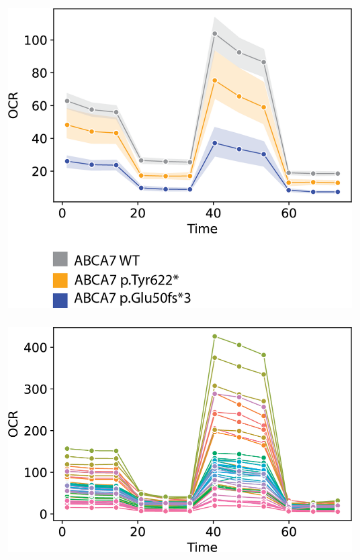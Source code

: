 \begin{figure}[H]
    \begin{subfigure}[t]{0.33\textwidth}
        \caption{}
        \includegraphics[width=\textwidth]{./extended_plots/rep_seahorse_curves_by_line.png}        
    \end{subfigure}
    \begin{subfigure}[t]{0.33\textwidth}
        \caption{}
        \includegraphics[width=\textwidth]{./extended_plots/rep_seahorse_curves_all.png}        
    \end{subfigure}   
    \begin{subfigure}[t]{0.33\textwidth}
        \caption{}

\end{subfigure}
\end{figure}
